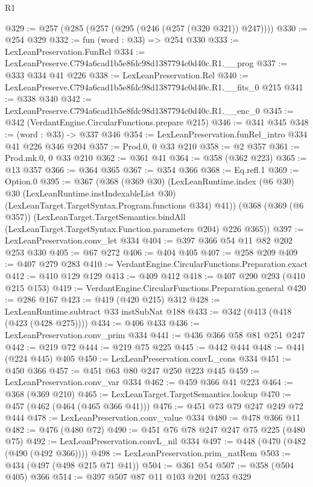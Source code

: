 \begin{lexlean}{R1}
\begin{coremodule}
@329 := @257 (@285 (@257 (@295 (@246 (@257 (@320 @321)) @247))))
@330 := @254 @329
@332 := fun (word : @33) => @254 @330
@333 := LexLeanPreservation.FunRel
@334 := LexLeanPreserve.C794a6cad1b5e8fdc98d1387794c0d40c.R1.__prog
@337 := @333 @334 @41 @226
@338 := LexLeanPreservation.Rel
@340 := LexLeanPreserve.C794a6cad1b5e8fdc98d1387794c0d40c.R1.__fits_0 @215
@341 := @338 @340
@342 := LexLeanPreserve.C794a6cad1b5e8fdc98d1387794c0d40c.R1.__enc_0
@345 := @342 (VerdantEngine.CircularFunctions.prepare @215)
@346 := @341 @345
@348 := (word : @33) -> @337 @346
@354 := LexLeanPreservation.funRel_intro @334 @41 @226 @346 @204
@357 := Prod.{0, 0} @33 @210
@358 := @2 @357
@361 := Prod.mk.{0, 0} @33 @210
@362 := @361 @41
@364 := @358 (@362 @223)
@365 := @13 @357
@366 := @364 @365
@367 := @354 @366
@368 := Eq.refl.{1}
@369 := Option.{0}
@395 := @367
    (@368
      (@369 @30)
      (LexLeanRuntime.index
        (@6 @30)
        @30
        (LexLeanRuntime.instIndexableList @30)
        (LexLeanTarget.TargetSyntax.Program.functions @334)
        @41))
    (@368
      (@369 (@6 @357))
      (LexLeanTarget.TargetSemantics.bindAll
        (LexLeanTarget.TargetSyntax.Function.parameters @204)
        @226
        @365))
@397 := LexLeanPreservation.conv_let @334
@404 := @397 @366 @54 @11 @82 @202 @253 @330
@405 := @67 @272
@406 := @404 @405
@407 := @258 @209
@409 := @407 @279 @283
@410 := VerdantEngine.CircularFunctions.Preparation.exact
@412 := @410 @129 @129
@413 := @409 @412
@418 := @407 @290 @293 (@410 @215 @153)
@419 := VerdantEngine.CircularFunctions.Preparation.general
@420 := @286 @167
@423 := @419 (@420 @215) @312
@428 := LexLeanRuntime.subtract @33 instSubNat @188
@433 := @342 (@413 (@418 (@423 (@428 @275))))
@434 := @406 @433
@436 := LexLeanPreservation.conv_prim @334
@441 := @436 @366 @58 @81 @251 @247
@442 := @219 @72
@444 := @219 @75 @225
@445 := @442 @444
@448 := @441 (@224 @445) @405
@450 := LexLeanPreservation.convL_cons @334
@451 := @450 @366
@457 := @451 @63 @80 @247 @250 @223 @445
@459 := LexLeanPreservation.conv_var @334
@462 := @459 @366 @41 @223
@464 := @368 (@369 @210)
@465 := LexLeanTarget.TargetSemantics.lookup
@470 := @457 (@462 (@464 (@465 @366 @41)))
@476 := @451 @73 @79 @247 @249 @72 @444
@478 := LexLeanPreservation.conv_value @334
@480 := @478 @366 @11
@482 := @476 (@480 @72)
@490 := @451 @76 @78 @247 @247 @75 @225 (@480 @75)
@492 := LexLeanPreservation.convL_nil @334
@497 := @448 (@470 (@482 (@490 (@492 @366))))
@498 := LexLeanPreservation.prim_natRem
@503 := @434 (@497 (@498 @215 @71 @41))
@504 := @361 @54
@507 := @358 (@504 @405) @366
@514 := @397 @507 @87 @11 @103 @201 @253 @329

\end{coremodule}
\end{lexlean}
